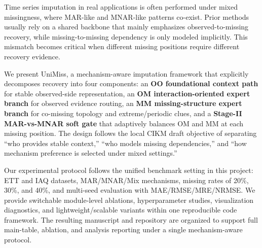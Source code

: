 Time series imputation in real applications is often performed under mixed missingness, where MAR-like and MNAR-like patterns co-exist. Prior methods usually rely on a shared backbone that mainly emphasizes observed-to-missing recovery, while missing-to-missing dependency is only modeled implicitly. This mismatch becomes critical when different missing positions require different recovery evidence.

We present UniMiss, a mechanism-aware imputation framework that explicitly decomposes recovery into four components: an \textbf{OO foundational context path} for stable observed-side representation, an \textbf{OM interaction-oriented expert branch} for observed evidence routing, an \textbf{MM missing-structure expert branch} for co-missing topology and extreme/periodic clues, and a \textbf{Stage-II MAR-vs-MNAR soft gate} that adaptively balances OM and MM at each missing position. The design follows the local CIKM draft objective of separating ``who provides stable context,'' ``who models missing dependencies,'' and ``how mechanism preference is selected under mixed settings.''

Our experimental protocol follows the unified benchmark setting in this project: ETT and IAQ datasets, MAR/MNAR/Mix mechanisms, missing rates of 20\%, 30\%, and 40\%, and multi-seed evaluation with MAE/RMSE/MRE/NRMSE. We provide switchable module-level ablations, hyperparameter studies, visualization diagnostics, and lightweight/scalable variants within one reproducible code framework. The resulting manuscript and repository are organized to support full main-table, ablation, and analysis reporting under a single mechanism-aware protocol.
